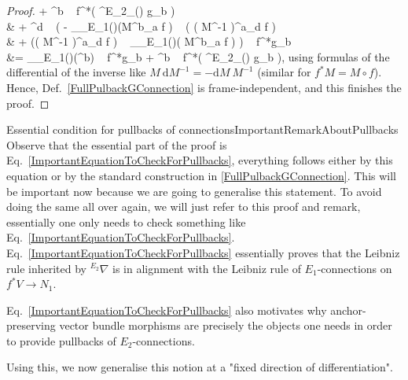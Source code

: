 \documentclass[CM,GP]{degruyter-crelle}       %
\theoremstyle{plain}
\theoremstyle{remark}
\theoremstyle{definition}
\begin{document}
\begin{proof}
	+ ^b ~ f^*\mleft( {}^{E_2}\nabla_{\xi(\nu)} g_b \mright)
\\
&\hspace{1cm}
	+ ^d ~ \biggl(
		- _{\rho_{E_1}(\nu)}\mleft(M^b_a \circ f \mright) ~ \mleft( \mleft( M^{-1} \mright)^a_d \circ f \mright)
\\
&  \hspace{2cm}
		+ \mleft(\mleft( M^{-1} \mright)^a_d \circ f \mright) ~ _{\rho_{E_1}(\nu)}\mleft( M^b_a \circ f \mright)
	\biggr) ~ f^*g_b
\\
&=
_{\rho_{E_1}(\nu)}\mleft(^b\mright) ~ f^*g_b
	+ ^b ~ f^*\mleft( {}^{E_2}\nabla_{\xi(\nu)} g_b \mright),
\eas
using formulas of the differential of the inverse like $M ~ \mathrm{d}M^{-1} = - \mathrm{d}M ~ M^{-1}$ (similar for $f^*M = M \circ f$). Hence, Def.~\eqref{FullPulbackGConnection} is frame-independent, and this finishes the proof.
\end{proof}

\begin{remarks}{Essential condition for pullbacks of connections}{ImportantRemarkAboutPullbacks}
Observe that the essential part of the proof is Eq.~\eqref{ImportantEquationToCheckForPullbacks}, everything follows either by this equation or by the standard construction in \eqref{FullPulbackGConnection}. This will be important now because we are going to generalise this statement. To avoid doing the same all over again, we will just refer to this proof and remark, essentially one only needs to check something like Eq.~\eqref{ImportantEquationToCheckForPullbacks}. Eq.~\eqref{ImportantEquationToCheckForPullbacks} essentially proves that the Leibniz rule inherited by ${}^{E_2}\nabla$ is in alignment with the Leibniz rule of $E_1$-connections on $f^*V \to N_1$.

Eq.~\eqref{ImportantEquationToCheckForPullbacks} also motivates why anchor-preserving vector bundle morphisms are precisely the objects one needs in order to provide pullbacks of $E_2$-connections.
\end{remarks}

Using this, we now generalise this notion at a "fixed direction of differentiation".
\end{document}
